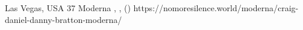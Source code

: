           {Las Vegas, USA}
          {37}
          {Moderna}
          {}
          {
            ,
            ,
             ()
          }
          {https://nomoresilence.world/moderna/craig-daniel-danny-bratton-moderna/}

